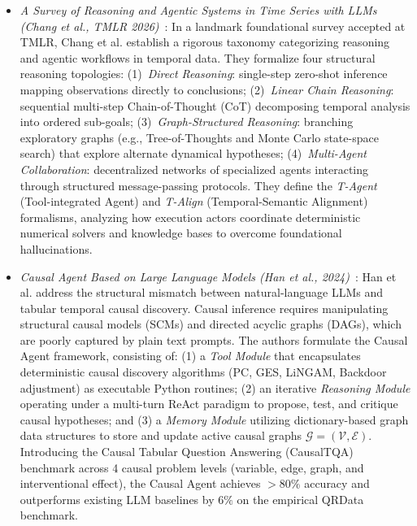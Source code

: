\begin{itemize}[leftmargin=*]
    \item \emph{A Survey of Reasoning and Agentic Systems in Time Series with LLMs (Chang et al., TMLR 2026)}~\cite{chang2026reasoningsurvey}: In a landmark foundational survey accepted at TMLR, Chang et al. establish a rigorous taxonomy categorizing reasoning and agentic workflows in temporal data. They formalize four structural reasoning topologies:
    (1)~\emph{Direct Reasoning}: single-step zero-shot inference mapping observations directly to conclusions;
    (2)~\emph{Linear Chain Reasoning}: sequential multi-step Chain-of-Thought (CoT) decomposing temporal analysis into ordered sub-goals;
    (3)~\emph{Graph-Structured Reasoning}: branching exploratory graphs (e.g., Tree-of-Thoughts and Monte Carlo state-space search) that explore alternate dynamical hypotheses;
    (4)~\emph{Multi-Agent Collaboration}: decentralized networks of specialized agents interacting through structured message-passing protocols. They define the \emph{T-Agent} (Tool-integrated Agent) and \emph{T-Align} (Temporal-Semantic Alignment) formalisms, analyzing how execution actors coordinate deterministic numerical solvers and knowledge bases to overcome foundational hallucinations.

    \item \emph{Causal Agent Based on Large Language Models (Han et al., 2024)}~\cite{han2024causalagent}: Han et al. address the structural mismatch between natural-language LLMs and tabular temporal causal discovery. Causal inference requires manipulating structural causal models (SCMs) and directed acyclic graphs (DAGs), which are poorly captured by plain text prompts. The authors formulate the Causal Agent framework, consisting of:
    (1) a \emph{Tool Module} that encapsulates deterministic causal discovery algorithms (PC, GES, LiNGAM, Backdoor adjustment) as executable Python routines;
    (2) an iterative \emph{Reasoning Module} operating under a multi-turn ReAct paradigm to propose, test, and critique causal hypotheses; and
    (3) a \emph{Memory Module} utilizing dictionary-based graph data structures to store and update active causal graphs $\mathcal{G} = (\mathcal{V}, \mathcal{E})$. Introducing the Causal Tabular Question Answering (CausalTQA) benchmark across 4 causal problem levels (variable, edge, graph, and interventional effect), the Causal Agent achieves $>80\%$ accuracy and outperforms existing LLM baselines by $6\%$ on the empirical QRData benchmark.


\end{itemize}

